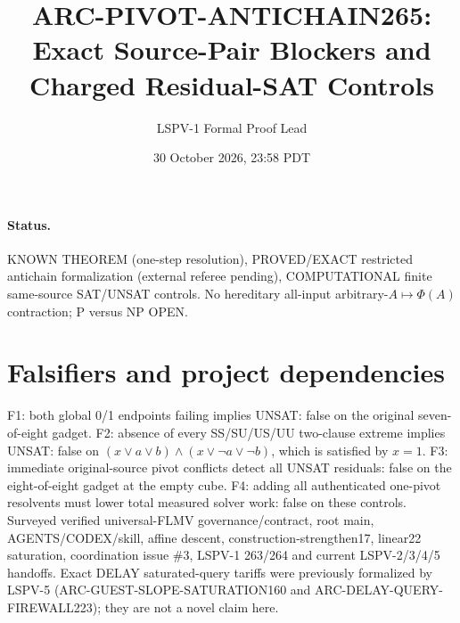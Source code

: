 \documentclass[11pt]{article}
\title{ARC-PIVOT-ANTICHAIN265: Exact Source-Pair Blockers and Charged Residual-SAT Controls}
\author{LSPV-1 Formal Proof Lead}
\date{30 October 2026, 23:58 PDT}
\begin{document}
\maketitle
\paragraph{Status.} KNOWN THEOREM (one-step resolution), PROVED/EXACT restricted antichain formalization (external referee pending), COMPUTATIONAL finite same-source SAT/UNSAT controls. No hereditary all-input arbitrary-$A\mapsto\Phi(A)$ contraction; P versus NP OPEN.
\section{Falsifiers and project dependencies}
F1: both global 0/1 endpoints failing implies UNSAT: false on the original seven-of-eight gadget. F2: absence of every SS/SU/US/UU two-clause extreme implies UNSAT: false on $(x\vee a\vee b)\wedge(x\vee\neg a\vee\neg b)$, which is satisfied by $x=1$. F3: immediate original-source pivot conflicts detect all UNSAT residuals: false on the eight-of-eight gadget at the empty cube. F4: adding all authenticated one-pivot resolvents must lower total measured solver work: false on these controls.
Surveyed verified universal-FLMV governance/contract, root main, AGENTS/CODEX/skill, affine descent, construction-strengthen17, linear22 saturation, coordination issue \#3, LSPV-1 263/264 and current LSPV-2/3/4/5 handoffs. Exact DELAY saturated-query tariffs were previously formalized by LSPV-5 (ARC-GUEST-SLOPE-SATURATION160 and ARC-DELAY-QUERY-FIREWALL223); they are not a novel claim here.
\end{document}
